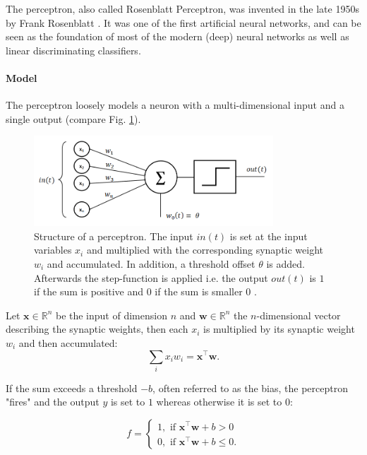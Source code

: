 The perceptron, also called Rosenblatt Perceptron, was invented in the late 1950s by Frank Rosenblatt \cite{rosenblatt1958perceptron}. 
It was one of the first artificial neural networks, and can be seen as the foundation of most of the modern (deep) neural networks as well as linear discriminating classifiers. 

\paragraph{Model} \label{c:permodel}

The perceptron loosely models a neuron with a multi-dimensional input and a single output (compare Fig. \ref{fig:perceptron}). 

\begin{figure}
	\centering
    	\includegraphics[width=0.8\textwidth]{imgs/percept.png} 
    \caption[Structure of a perceptron.]{Structure of a perceptron. The input $in(t)$ is set at the input variables $x_i$ and multiplied with the corresponding synaptic weight $w_i$ and accumulated. In addition, a threshold offset $\theta$ is added. Afterwards the step-function is applied i.e. the output $out(t)$ is $1$ if the sum is positive and $0$ if the sum is smaller $0$ \cite{perceptronImg}.}
	\label{fig:perceptron}
\end{figure}

Let $\textbf{x} \in \mathbb{R}^n$ be the input of dimension $n$ and $\textbf{w}\in \mathbb{R}^n$ the $n$-dimensional vector describing the synaptic weights, then each $x_i$ is multiplied by its synaptic weight $w_i$ and then accumulated:
\[
\sum_i x_i w_i = \textbf{x}^\intercal \textbf{w}.
\] 

If the sum exceeds a threshold $-b$, often referred to as the bias, the perceptron "fires" and the output $y$ is set to $1$ whereas otherwise it is set to $0$:

\[
	f = 
		\begin{cases}
			1, \text{  if  } \textbf{x}^\intercal \textbf{w} + b > 0  \\
			0, \text{  if  } \textbf{x}^\intercal \textbf{w} + b \le 0 .
		\end{cases}	
\]

